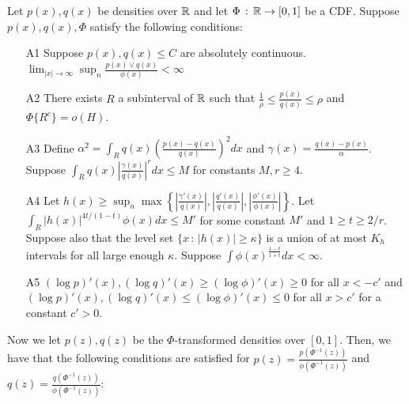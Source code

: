 \begin{proposition}
\label{prop:transformation1}
Let $p(x), q(x)$ be densities over ${\mathbb R}$ and let $\Phi \,:\, {\mathbb R} \rightarrow [0,1]$ be a CDF. Suppose $p(x), q(x), \Phi$ satisfy the following conditions:

\begin{enumerate}
\item[A1] Suppose $p(x), q(x) \leq C$ are absolutely continuous.  $\lim_{|x| \rightarrow \infty} \sup_n \frac{p(x) \vee q(x)}{\phi(x)} < \infty$
\item[A2] There exists $R$ a subinterval of ${\mathbb R}$ such that $\frac{1}{\rho} \leq \frac{p(x)}{q(x)} \leq \rho $ and $\Phi\{R^c\} = o(H)$.

\item[A3] Define $\alpha^2 = \int_R q(x) \left( \frac{p(x) - q(x)}{q(x)} \right)^2 dx$ and $\gamma(x) = \frac{q(x) - p(x)}{\alpha}$. Suppose $\int_R q(x) \left| \frac{\gamma(x)}{q(x)} \right|^r dx  \leq M$ for constants $M, r \geq 4$.
\item[A4] Let $h(x) \geq \sup_n \max \left\{  \left|\frac{\gamma'(x)}{q(x)} \right|, 
 \left|\frac{q'(x)}{q(x)}\right|, \left| \frac{\phi'(x)}{\phi(x)}\right|  \right\} $. Let $\int_R |h(x)|^{4t/(1-t)} \phi(x) dx \leq M'$ for some constant $M'$ and $1 \geq t \geq 2/r$. Suppose also that the level set $\{x \,:\, |h(x)| \geq \kappa\}$ is a union of at most $K_h$ intervals for all large enough $\kappa$. Suppose $\int \phi(x)^{\frac{1-t}{1+t}} dx < \infty$.
\item[A5]  $(\log p)'(x), (\log q)'(x) \geq (\log \phi)'(x) \geq 0$ for all $x < -c'$ and $ (\log p)'(x), (\log q)'(x) \leq (\log \phi)'(x) \leq 0$ for all $x > c'$ for a constant $c' > 0$.
\end{enumerate}

Now we let $p(z), q(z)$ be the $\Phi$-transformed densities over $[0,1]$.
Then, we have that the following conditions are satisfied for $p(z) = \frac{p(\Phi^{-1}(z))}{\phi(\Phi^{-1}(z))}$ and $q(z) = \frac{q(\Phi^{-1}(z))}{\phi(\Phi^{-1}(z))}$:


\end{proposition}
